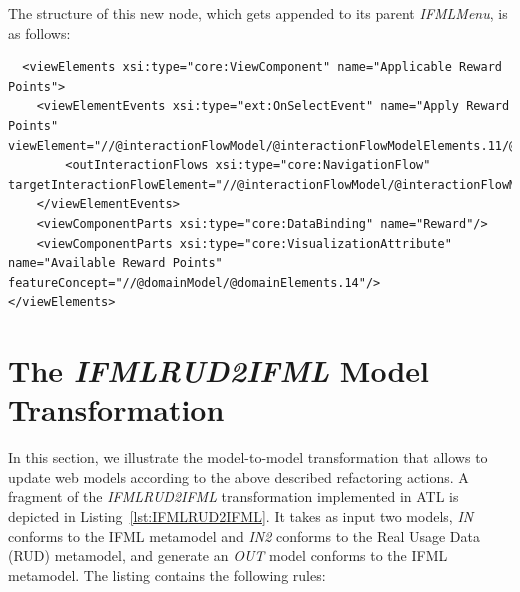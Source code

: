 The structure of this new node, which gets appended to its parent \textit{IFMLMenu}, is as follows:

\vspace{0.5cm}
\lstset{language=XML}
\begin{lstlisting} 
  <viewElements xsi:type="core:ViewComponent" name="Applicable Reward Points">
    <viewElementEvents xsi:type="ext:OnSelectEvent" name="Apply Reward Points" viewElement="//@interactionFlowModel/@interactionFlowModelElements.11/@viewElements.2/@viewElements.3">
        <outInteractionFlows xsi:type="core:NavigationFlow" targetInteractionFlowElement="//@interactionFlowModel/@interactionFlowModelElements.18/@actionEvents.0"/>
    </viewElementEvents>
    <viewComponentParts xsi:type="core:DataBinding" name="Reward"/>
    <viewComponentParts xsi:type="core:VisualizationAttribute"  name="Available Reward Points" featureConcept="//@domainModel/@domainElements.14"/>
</viewElements>
\end{lstlisting}
\vspace{0.5cm}

\newpage
\section{The \textit{IFMLRUD2IFML} Model Transformation}

In this section, we illustrate the model-to-model transformation that allows to update web models according to the above described refactoring actions. A fragment of the \textit{IFMLRUD2IFML} transformation implemented in ATL\cite{ATL} is depicted in Listing~\ref{lst:IFMLRUD2IFML}. It takes as input two models, \textit{IN}
conforms to the IFML metamodel and  \textit{IN2} conforms to the Real Usage Data (RUD) metamodel, and generate an \textit{OUT} model conforms to the IFML metamodel. The listing contains the following rules: 

